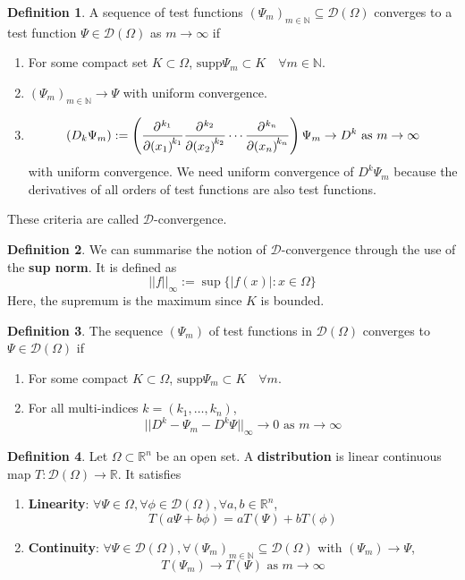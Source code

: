 \documentclass[12pt,a4paper]{article}
\theoremstyle{definition}
\newtheorem{definition}{Definition}[subsection]
\begin{document}
\begin{definition}
	A sequence of test functions ${(\Psi_m)}_{m \in \mathbb{N}} \subseteq \mathcal{D}(\Omega)$ converges to a test function $\Psi \in \mathcal{D}(\Omega)$ as $m \rightarrow \infty$ if
	\begin{enumerate}
		\item For some compact set $K \subset \Omega$, $\text{supp} \Psi_m \subset K \quad \forall m \in \mathbb{N}$.
		\item ${(\Psi_m)}_{m \in \mathbb{N}} \rightarrow \Psi$ with uniform convergence.
		\item \[
			{(D_k \Psi_m)} := \left( \diffp[k_1]{}{x_1} \diffp[k_2]{}{x_2} \cdots \diffp[k_n]{}{x_n} \right) \Psi_m \rightarrow D^k \text{ as } m \rightarrow \infty
		\]
		with uniform convergence. We need uniform convergence of $D^k \Psi_m$ because the derivatives of all orders of test functions are also test functions.
	\end{enumerate}
	These criteria are called $\mathcal{D}$-convergence.
\end{definition}

\begin{definition}
	We can summarise the notion of $\mathcal{D}$-convergence through the use of the \textbf{sup norm}. It is defined as
	\[
		||f||_{\infty} := \sup \{ |f(x)|: x \in \Omega \}
	\]
	Here, the supremum is the maximum since $K$ is bounded.
\end{definition}

\begin{definition}
	The sequence ${(\Psi_m)}$ of test functions in $\mathcal{D}(\Omega)$ converges to $\Psi \in \mathcal{D} (\Omega)$ if
	\begin{enumerate}
		\item For some compact $K \subset \Omega$, $\text{supp} \Psi_m \subset K \quad \forall m$.
		\item For all multi-indices $k = (k_1, \dots, k_n)$,
		\[
			|| D^k - \Psi_m - D^k \Psi ||_{\infty} \rightarrow 0 \text{ as } m \rightarrow \infty
		\]
	\end{enumerate}
\end{definition}

\begin{definition}
	Let $\Omega \subset \mathbb{R}^n$ be an open set. A \textbf{distribution} is linear continuous map $T: \mathcal{D}(\Omega) \rightarrow \mathbb{R}$. It satisfies
	\begin{enumerate}
		\item \textbf{Linearity}: $\forall \Psi \in \mathcal{\Omega}, \forall \phi \in \mathcal{D}(\Omega), \forall a, b \in \mathbb{R}^n$,
		\[
			T(a \Psi + b \phi) = a T(\Psi) + b T(\phi)
		\]
		\item \textbf{Continuity}: $\forall \Psi \in \mathcal{D}(\Omega), \forall {(\Psi_m)}_{m \in \mathbb{N}} \subseteq \mathcal{D}(\Omega)$ with $(\Psi_m) \rightarrow \Psi$,
		\[
			T(\Psi_m) \rightarrow T(\Psi) \text{ as } m \rightarrow \infty
		\]
	\end{enumerate}
\end{definition}
\end{document}

